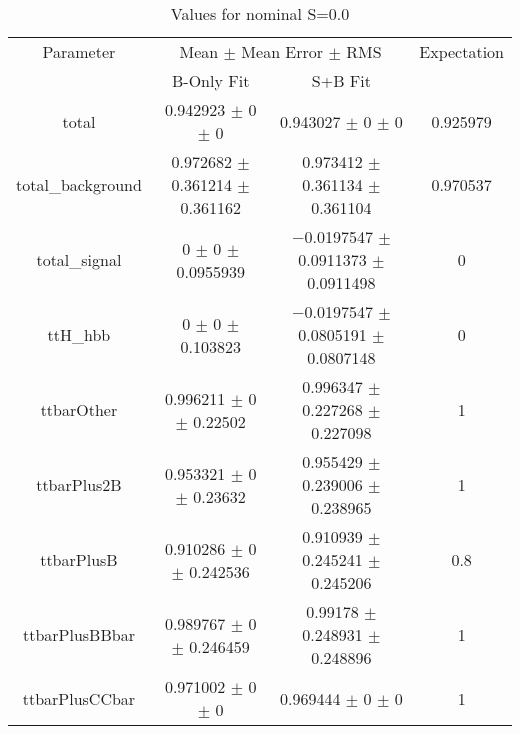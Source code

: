 \begin{table}
\centering
\caption{Values for nominal S=0.0}
\begin{tabular}{cccc}
\toprule
Parameter & \multicolumn{2}{c}{Mean $\pm$ Mean Error $\pm$ RMS} & Expectation\\
 & B-Only Fit & S+B Fit & \\
\midrule
total & \num{0.942923} $\pm$ \num{0} $\pm$ \num{0} & \num{0.943027} $\pm$ \num{0} $\pm$ \num{0} & \num{0.925979}\\
total\_background & \num{0.972682} $\pm$ \num{0.361214} $\pm$ \num{0.361162} & \num{0.973412} $\pm$ \num{0.361134} $\pm$ \num{0.361104} & \num{0.970537}\\
total\_signal & \num{0} $\pm$ \num{0} $\pm$ \num{0.0955939} & \num{-0.0197547} $\pm$ \num{0.0911373} $\pm$ \num{0.0911498} & \num{0}\\
ttH\_hbb & \num{0} $\pm$ \num{0} $\pm$ \num{0.103823} & \num{-0.0197547} $\pm$ \num{0.0805191} $\pm$ \num{0.0807148} & \num{0}\\
ttbarOther & \num{0.996211} $\pm$ \num{0} $\pm$ \num{0.22502} & \num{0.996347} $\pm$ \num{0.227268} $\pm$ \num{0.227098} & \num{1}\\
ttbarPlus2B & \num{0.953321} $\pm$ \num{0} $\pm$ \num{0.23632} & \num{0.955429} $\pm$ \num{0.239006} $\pm$ \num{0.238965} & \num{1}\\
ttbarPlusB & \num{0.910286} $\pm$ \num{0} $\pm$ \num{0.242536} & \num{0.910939} $\pm$ \num{0.245241} $\pm$ \num{0.245206} & \num{0.8}\\
ttbarPlusBBbar & \num{0.989767} $\pm$ \num{0} $\pm$ \num{0.246459} & \num{0.99178} $\pm$ \num{0.248931} $\pm$ \num{0.248896} & \num{1}\\
ttbarPlusCCbar & \num{0.971002} $\pm$ \num{0} $\pm$ \num{0} & \num{0.969444} $\pm$ \num{0} $\pm$ \num{0} & \num{1}\\
\bottomrule
\end{tabular}
\end{table}